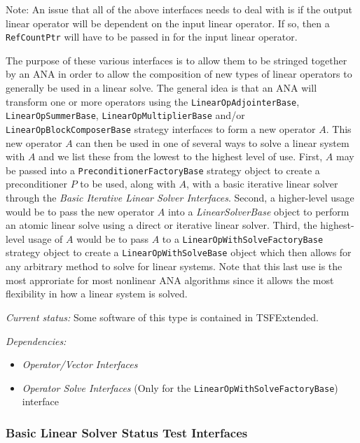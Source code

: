 \documentclass[pdf,ps2pdf,11pt]{SANDreport}
\begin{document}
Note: An issue that all of the above interfaces needs to deal with is if the
output linear operator will be dependent on the input linear operator.  If so,
then a {}\texttt{RefCountPtr} will have to be passed in for the input linear
operator.

The purpose of these various interfaces is to allow them to be stringed
together by an ANA in order to allow the composition of new types of linear
operators to generally be used in a linear solve.  The general idea is that an
ANA will transform one or more operators using the
{}\texttt{Linear\-Op\-Adjointer\-Base}, {}\texttt{Linear\-Op\-Summer\-Base},
{}\texttt{Linear\-Op\-Multiplier\-Base} and/or
{}\texttt{Linear\-Op\-Block\-Composer\-Base} strategy interfaces to form a new
operator $A$.  This new operator $A$ can then be used in one of several ways
to solve a linear system with $A$ and we list these from the lowest to the
highest level of use.  First, $A$ may be passed into a
{}\texttt{Preconditioner\-Factory\-Base} strategy object to create a
preconditioner $P$ to be used, along with $A$, with a basic iterative linear
solver through the {}\textit{Basic Iterative Linear Solver Interfaces}.
Second, a higher-level usage would be to pass the new operator $A$ into a
{}\textit{Linear\-Solver\-Base} object to perform an atomic linear solve using
a direct or iterative linear solver.  Third, the highest-level usage of $A$
would be to pass $A$ to a {}\texttt{Linear\-Op\-With\-Solve\-Factory\-Base}
strategy object to create a {}\texttt{Linear\-Op\-With\-Solve\-Base} object
which then allows for any arbitrary method to solve for linear systems.  Note
that this last use is the most approriate for most nonlinear ANA algorithms
since it allows the most flexibility in how a linear system is solved.

{}\textit{Current status:} Some software of this type is contained in
TSFExtended.

{}\textit{Dependencies:}
\begin{itemize}
\item {}\textit{Operator/Vector Interfaces}
\item {}\textit{Operator Solve Interfaces} (Only for the {}\texttt{Linear\-Op\-With\-Solve\-Factory\-Base})
interface
\end{itemize}

%
\subsubsection{Basic Linear Solver Status Test Interfaces}
%
\end{document}
